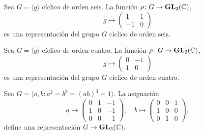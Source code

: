 \begin{example}
Sea $G=\langle g\rangle$ cíclico de orden seis. 
La función $\rho\colon G\to\mathbf{GL}_2(\mathbb{C})$, 
\[
g\mapsto
\begin{pmatrix}
1&1\\
-1&0
\end{pmatrix}
\] 
es una representación del grupo $G$ cíclico de orden seis. 
\end{example}

\begin{example}
Sea $G=\langle g\rangle$ cíclico de orden cuatro. 
La función $\rho\colon G\to\mathbf{GL}_2(\mathbb{C})$, 
\[
g\mapsto
\begin{pmatrix}
0&-1\\
1&0
\end{pmatrix}
\] 
es una representación del grupo $G$ cíclico de orden cuatro. 
\end{example}


\begin{example}
  Sea $G=\langle a,b:a^2=b^3=(ab)^3=1\rangle$. La asignación 
  \[
    a\mapsto\begin{pmatrix}
    0 & 1 & -1\\
    1 & 0 & -1\\
    0 & 0 & -1
    \end{pmatrix},
    \quad
    b\mapsto\begin{pmatrix}
      0 & 0 & 1\\
      1 & 0 & 0\\
      0 & 1 & 0
    \end{pmatrix},
  \]
  define una representación $G\to\mathbf{GL}_3(\mathbb{C})$. 
\end{example}


